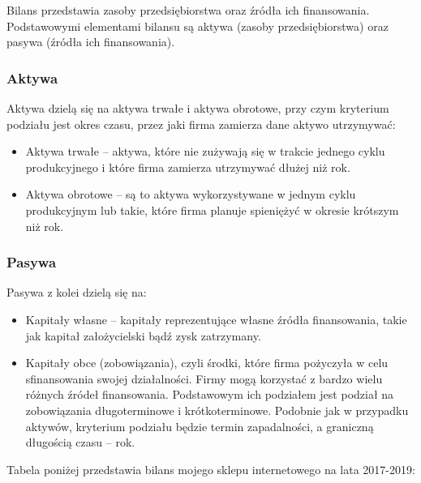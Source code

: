 
	\par Bilans przedstawia zasoby przedsiębiorstwa oraz źródła ich finansowania. Podstawowymi elementami bilansu są aktywa (zasoby przedsiębiorstwa) oraz pasywa (źródła ich finansowania).
	
	\subsubsection{Aktywa}
		\par Aktywa dzielą się na aktywa trwałe i aktywa obrotowe, przy czym kryterium podziału jest okres czasu, przez jaki firma zamierza dane aktywo utrzymywać:

			\begin{itemize}
				\item Aktywa trwałe – aktywa, które nie zużywają się w trakcie jednego cyklu produkcyjnego i które firma zamierza utrzymywać dłużej niż rok.
				\item Aktywa obrotowe – są to aktywa wykorzystywane w jednym cyklu produkcyjnym lub takie, które firma planuje spieniężyć w okresie krótszym niż rok.
			\end{itemize}
			
			\subsubsection{Pasywa}
				\par Pasywa z kolei dzielą się na:

			\begin{itemize}
				\item Kapitały własne – kapitały reprezentujące własne źródła finansowania, takie jak kapitał założycielski bądź zysk zatrzymany.
				\item Kapitały obce (zobowiązania), czyli środki, które firma pożyczyła w celu sfinansowania swojej działalności. Firmy mogą korzystać z bardzo wielu różnych źródeł finansowania. Podstawowym ich podziałem jest podział na zobowiązania długoterminowe i krótkoterminowe. Podobnie jak w przypadku aktywów, kryterium podziału będzie termin zapadalności, a graniczną długością czasu – rok.
			\end{itemize}
 
	\par Tabela poniżej przedstawia bilans mojego sklepu internetowego na lata 2017-2019:
	
	
	
